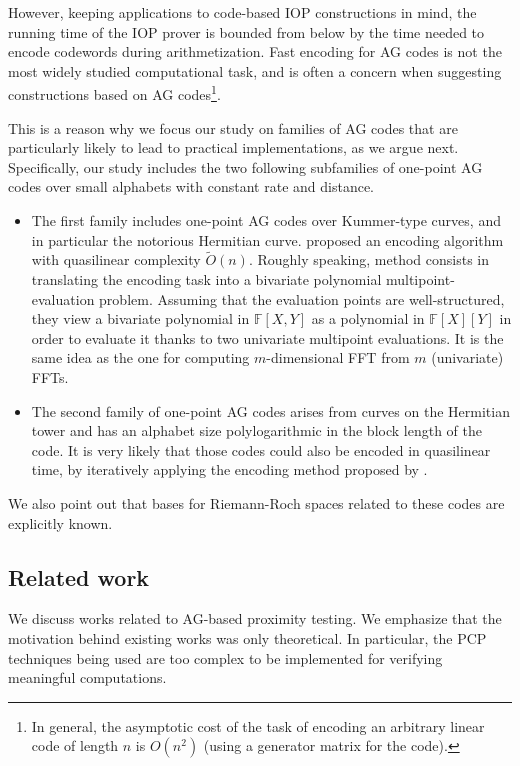 \documentclass[a4paper,USenglish,autoref]{lipics-v2021}
\newcommand\F{\mathbb{F}}
\begin{document}
However, keeping applications to code-based IOP constructions in mind, the running time of the IOP prover is bounded from below by the time needed to encode codewords during arithmetization. 
Fast encoding for AG codes is not the most widely studied computational task, and is often a concern when suggesting constructions based on AG codes\footnote{In general, the asymptotic cost of the task of encoding an arbitrary linear code of length $n$ is $O(n^2)$ (using a generator matrix for the code).}.

This is a reason why we focus our study on families of AG codes that are particularly likely to lead to practical implementations, as we argue next. Specifically, our study includes the two following subfamilies of one-point AG codes over small alphabets with constant rate and distance.

\begin{itemize}
	\item The first family includes one-point AG codes over Kummer-type curves, and in particular the notorious Hermitian curve. \cite{BRS20} proposed an encoding algorithm with quasilinear complexity $\widetilde{O}(n)$. Roughly speaking, \cite{BRS20} method consists in translating the encoding task into a bivariate polynomial multipoint-evaluation problem. Assuming that the evaluation points are well-structured, they view a bivariate polynomial in $\F[X, Y]$ as a polynomial in $\F[X][Y]$ in order to evaluate it thanks to two univariate multipoint evaluations. It is the same idea as the one for computing $m$-dimensional FFT from $m$ (univariate) FFTs.
	\item The second family of one-point AG codes arises from curves on the Hermitian tower and has an alphabet size polylogarithmic in the block length of the code. It is very likely that those codes could also be encoded in quasilinear time, by iteratively applying the encoding method proposed by \cite{BRS20}.
\end{itemize}

We also point out that bases for Riemann-Roch spaces related to these codes are explicitly known.

\subsection{Related work}
We discuss works related to AG-based proximity testing. We emphasize that the motivation behind existing works was only theoretical. In particular, the PCP techniques being used are too complex to be implemented for verifying meaningful computations.
\end{document}
